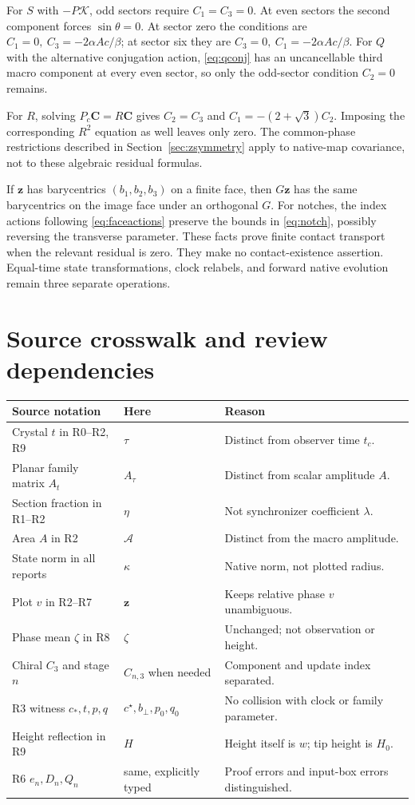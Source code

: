 \documentclass[11pt,a4paper]{article}
\numberwithin{equation}{section}
\newcommand{\zobs}{\mathbf z}
\newcommand{\chiral}{\mathbf C}
\begin{document}
For $S$ with $-P\mathcal K$, odd sectors require $C_1=C_3=0$.
At even sectors the second component forces $\sin\theta=0$.
At sector zero the conditions are $C_1=0,\ C_3=-2\alpha Ac/\beta$;
at sector six they are $C_3=0,\ C_1=-2\alpha Ac/\beta$.
For $Q$ with the alternative conjugation action,
\eqref{eq:qconj} has an uncancellable third macro component at every even
sector, so only the odd-sector condition $C_2=0$ remains.

For $R$, solving $P_c\chiral=R\chiral$ gives
$C_2=C_3$ and $C_1=-(2+\sqrt3)C_2$. Imposing the corresponding
$R^2$ equation as well leaves only zero.
The common-phase restrictions described in Section~\ref{sec:zsymmetry}
apply to native-map covariance, not to these algebraic residual formulas.

If $\zobs$ has barycentrics $(b_1,b_2,b_3)$ on a finite face, then $G\zobs$
has the same barycentrics on the image face under an orthogonal $G$.
For notches, the index actions following \eqref{eq:faceactions} preserve
the bounds in \eqref{eq:notch}, possibly reversing the transverse
parameter. These facts prove finite contact transport when the relevant
residual is zero. They make no contact-existence assertion. Equal-time
state transformations, clock relabels, and forward native evolution remain
three separate operations.

\section{Source crosswalk and review dependencies}\label{app:crosswalk}
\begin{longtable}{@{}>{\raggedright\arraybackslash}p{}>{\raggedright\arraybackslash}p{}>{\raggedright\arraybackslash}p{}@{}}
\toprule Source notation & Here & Reason\\ \midrule\endhead
Crystal $t$ in R0--R2, R9 & $\tau$ & Distinct from observer time $t_c$.\\
Planar family matrix $A_t$ & $A_\tau$ & Distinct from scalar amplitude $A$.\\
Section fraction in R1--R2 & $\eta$ & Not synchronizer coefficient $\lambda$.\\
Area $A$ in R2 & $\mathscr A$ & Distinct from the macro amplitude.\\
State norm in all reports & $\kappa$ & Native norm, not plotted radius.\\
Plot $v$ in R2--R7 & $\zobs$ & Keeps relative phase $v$ unambiguous.\\
Phase mean $\zeta$ in R8 & $\zeta$ & Unchanged; not observation or height.\\
Chiral $C_3$ and stage $n$ & $C_{n,3}$ when needed & Component and update index separated.\\
R3 witness $c_*,t,p,q$ & $c^\star,b_\perp,p_0,q_0$ & No collision with clock or family parameter.\\
Height reflection in R9 & $H$ & Height itself is $w$; tip height is $H_0$.\\
R6 $e_n,D_n,Q_n$ & same, explicitly typed & Proof errors and input-box errors distinguished.\\
\bottomrule
\end{longtable}
\end{document}
